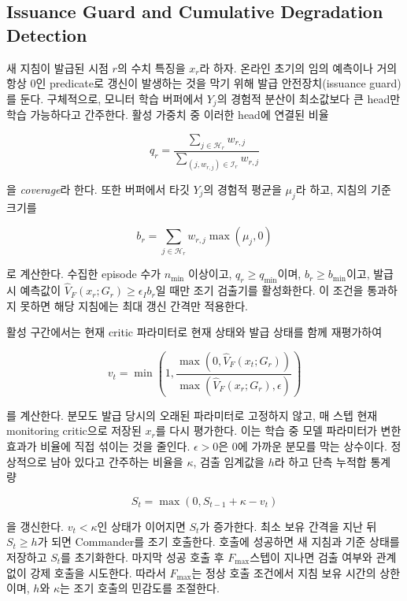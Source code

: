\subsection{Issuance Guard and Cumulative Degradation Detection}

새 지침이 발급된 시점 $r$의 수치 특징을 $x_r$라 하자. 온라인 초기의 임의 예측이나
거의 항상 0인 predicate로 갱신이 발생하는 것을 막기 위해 발급 안전장치(issuance
guard)를 둔다. 구체적으로, 모니터 학습 버퍼에서 $Y_j$의 경험적 분산이 최소값보다
큰 head만 학습 가능하다고 간주한다. 활성 가중치 중 이러한 head에 연결된 비율

\begin{equation}
q_r=\frac{\sum_{j\in\mathcal H_r}w_{r,j}}
{\sum_{(j,w_{r,j})\in\mathcal I_r}w_{r,j}}
\label{eq:coverage}
\end{equation}

을 \emph{coverage}라 한다. 또한 버퍼에서 타깃 $Y_j$의 경험적 평균을 $\mu_j$라 하고,
지침의 기준 크기를

\begin{equation}
b_r=\sum_{j\in\mathcal H_r}w_{r,j}\max(\mu_j,0)
\label{eq:issuance-base}
\end{equation}

로 계산한다. 수집한 episode 수가 $n_{\min}$ 이상이고, $q_r\ge q_{\min}$이며,
$b_r\ge b_{\min}$이고, 발급 시 예측값이
$\widehat V_F(x_r;G_r)\ge\epsilon_I b_r$일 때만 조기 검출기를 활성화한다. 이 조건을
통과하지 못하면 해당 지침에는 최대 갱신 간격만 적용한다.

활성 구간에서는 현재 critic 파라미터로 현재 상태와 발급 상태를 함께 재평가하여

\begin{equation}
v_t=\min\!\left(1,
\frac{\max(0,\widehat V_F(x_t;G_r))}
{\max(\widehat V_F(x_r;G_r),\epsilon)}
\right)
\label{eq:ratio}
\end{equation}

를 계산한다. 분모도 발급 당시의 오래된 파라미터로 고정하지 않고, 매 스텝 현재
monitoring critic으로 저장된 $x_r$를 다시 평가한다. 이는 학습 중 모델 파라미터가
변한 효과가 비율에 직접 섞이는 것을 줄인다. $\epsilon>0$은 0에 가까운 분모를 막는
상수이다. 정상적으로 남아 있다고 간주하는 비율을 $\kappa$, 검출 임계값을 $h$라 하고
단측 누적합 통계량~\cite{page1954cusum}

\begin{equation}
S_t=\max(0,S_{t-1}+\kappa-v_t)
\label{eq:cusum}
\end{equation}

을 갱신한다. $v_t<\kappa$인 상태가 이어지면 $S_t$가 증가한다. 최소 보유 간격을
지난 뒤 $S_t\ge h$가 되면 Commander를 조기
호출한다. 호출에 성공하면 새 지침과 기준 상태를 저장하고 $S_t$를 초기화한다.
마지막 성공 호출 후 $F_{\max}$스텝이 지나면 검출 여부와 관계없이 강제 호출을
시도한다. 따라서 $F_{\max}$는 정상 호출 조건에서 지침 보유 시간의 상한이며,
$h$와 $\kappa$는 조기 호출의 민감도를 조절한다.

